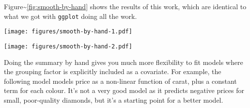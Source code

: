 Figure\textasciitilde{}\ref{fig:smooth-by-hand} shows the results of
this work, which are identical to what we got with \texttt{ggplot} doing
all the work.

\begin{Shaded}
\begin{Highlighting}[]
\StringTok{ }
  \StringTok{ }\StringTok{ } \NormalTok{), } 
  \StringTok{ }\NormalTok{(} \NormalTok{(}\NormalTok{, }\NormalTok{, } \NormalTok{))}
  \StringTok{ } 
  
  \StringTok{ }
  \StringTok{ }
\NormalTok{\}}
\StringTok{ }
  
   \NormalTok{)}
\end{Highlighting}
\end{Shaded}

\texttt{[image: figures/smooth-by-hand-1.pdf]}

\begin{Shaded}
\begin{Highlighting}[]
  
   \NormalTok{, } \StringTok{ } \NormalTok{*}\StringTok{ } \StringTok{ } \NormalTok{*}\StringTok{ }
\end{Highlighting}
\end{Shaded}

\texttt{[image: figures/smooth-by-hand-2.pdf]}

Doing the summary by hand gives you much more flexibility to fit models
where the grouping factor is explicitly included as a covariate. For
example, the following model models price as a non-linear function of
carat, plus a constant term for each colour. It's not a very good model
as it predicts negative prices for small, poor-quality diamonds, but
it's a starting point for a better model.

